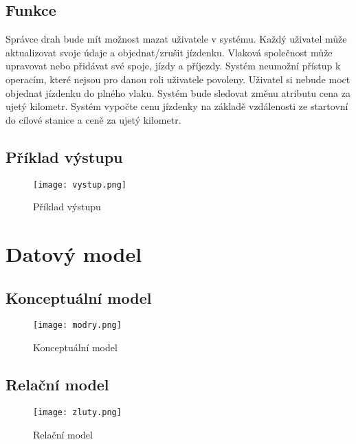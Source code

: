 \documentclass[11pt]{article}
\begin{document}
\subsection{Funkce}
Správce drah bude mít možnost mazat uživatele v systému. Každý uživatel může aktualizovat svoje údaje a objednat/zrušit jízdenku. Vlaková společnost může upravovat nebo přidávat své spoje, jízdy a příjezdy. Systém neumožní přístup k operacím, které nejsou pro danou roli uživatele povoleny. Uživatel si nebude moct objednat jízdenku do plného vlaku. Systém bude sledovat změnu atributu cena za ujetý kilometr. Systém vypočte cenu jízdenky na základě vzdálenosti ze startovní do cílové stanice a ceně za ujetý kilometr.

\subsection{Příklad výstupu}
\begin{figure}[H]
    \texttt{[image: vystup.png]}
    \centering
    \caption{Příklad výstupu}
    \label{vystup}
\end{figure}

\newpage

\section{Datový model}

\subsection{Konceptuální model}
\begin{figure}[H]
    \texttt{[image: modry.png]}
    \centering
    \caption{Konceptuální model}
    \label{konceptualni}
\end{figure}

\subsection{Relační model}
\begin{figure}[H]
    \texttt{[image: zluty.png]}
    \centering
    \caption{Relační model}
    \label{relacni}
\end{figure}

\newpage
\end{document}
